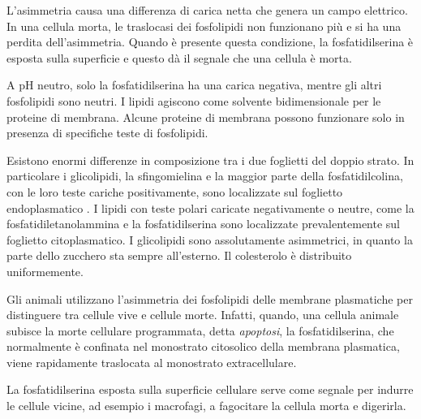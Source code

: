 L'asimmetria causa una differenza di carica netta che genera un campo elettrico. In una cellula morta, le traslocasi dei fosfolipidi non funzionano più e si ha una perdita dell'asimmetria. Quando è presente questa condizione, la fosfatidilserina è esposta sulla superficie e questo dà il segnale che una cellula è morta.


A pH neutro, solo la fosfatidilserina ha una carica negativa, mentre gli altri fosfolipidi sono neutri. I lipidi agiscono come solvente bidimensionale per le proteine di membrana. Alcune proteine di membrana possono funzionare solo in presenza di specifiche teste di fosfolipidi.

Esistono enormi differenze in composizione tra i due foglietti del doppio strato. In particolare i glicolipidi, la sfingomielina e la maggior parte della fosfatidilcolina, con le loro teste cariche positivamente, sono localizzate sul foglietto endoplasmatico . I lipidi con teste polari caricate negativamente o neutre, come la fosfatidiletanolammina e la fosfatidilserina sono localizzate prevalentemente sul foglietto citoplasmatico. I glicolipidi sono assolutamente asimmetrici, in quanto la parte dello zucchero sta sempre all'esterno. Il colesterolo è distribuito uniformemente.

Gli animali utilizzano l'asimmetria dei fosfolipidi delle membrane plasmatiche per distinguere tra cellule vive e cellule morte. Infatti, quando, una cellula animale subisce la morte cellulare programmata, detta \emph{apoptosi}, la fosfatidilserina, che normalmente è confinata nel monostrato citosolico della membrana plasmatica, viene rapidamente traslocata al monostrato extracellulare.

La fosfatidilserina esposta sulla superficie cellulare serve come segnale per indurre le cellule vicine, ad esempio i macrofagi, a fagocitare la cellula morta e digerirla.


